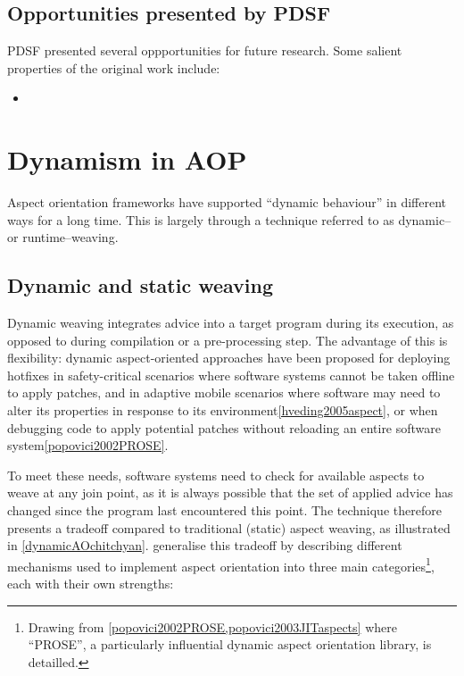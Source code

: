 \subsection{Opportunities presented by PDSF}

PDSF presented several oppportunities for future research. Some salient
properties of the original work include:

\begin{itemize}
    \item 
\end{itemize}


\section{Dynamism in AOP}

Aspect orientation frameworks have supported ``dynamic behaviour'' in different
ways for a long time. This is largely through a technique referred to as dynamic–
or runtime–weaving.

\subsection{Dynamic and static weaving}

Dynamic weaving integrates advice into a target program during its execution, as
opposed to during compilation or a pre-processing step. The advantage of this is
flexibility: dynamic aspect-oriented approaches have been proposed for deploying
hotfixes in safety-critical scenarios where software systems cannot be taken
offline to apply patches, and in adaptive mobile scenarios where software
may need to alter its properties in response to its
environment\cref{hveding2005aspect}, or when debugging code to apply potential
patches without reloading an entire software system\cref{popovici2002PROSE}.

To meet these needs, software systems need to check for available aspects to
weave at any join point, as it is always possible that the set of applied advice
has changed since the program last encountered this point. The technique
therefore presents a tradeoff compared to traditional (static) aspect weaving,
as illustrated in \cref{dynamicAOchitchyan}. \citeauthor{dynamicAOchitchyan}
generalise this tradeoff by describing different mechanisms used to implement
aspect orientation into three main categories\footnote{Drawing from
\cref{popovici2002PROSE,popovici2003JITaspects} where ``PROSE'', a particularly
influential dynamic aspect orientation library, is detailled.}, each with their own
strengths:

